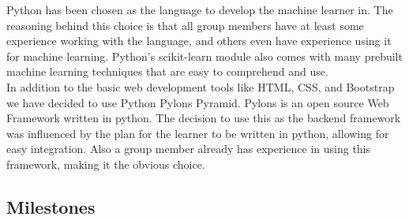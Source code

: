 \documentclass{ecmm427_assignment}
\begin{document}
\quad Python has been chosen as the language to develop the machine learner in. The reasoning behind this choice is that all group members have at least some experience working with the language, and others even have experience using it for machine learning. Python’s scikit-learn module also comes with many prebuilt machine learning techniques that are easy to comprehend and use.\\

\quad In addition to the basic web development tools like HTML, CSS, and Bootstrap we have decided to use Python Pylons Pyramid. Pylons is an open source Web Framework written in python. The decision to use this as the backend framework was influenced by the plan for the learner to be written in python, allowing for easy integration. Also a group member already has experience in using this framework, making it the obvious choice.\\

\subsection{Milestones}
\end{document}
